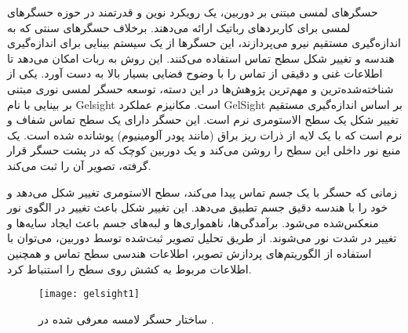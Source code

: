 حسگرهای لمسی مبتنی بر دوربین، یک رویکرد نوین و قدرتمند در حوزه حسگرهای لمسی برای کاربردهای رباتیک ارائه می‌دهند. برخلاف حسگرهای سنتی که به اندازه‌گیری مستقیم نیرو می‌پردازند، این حسگرها از یک سیستم بینایی برای اندازه‌گیری هندسه و تغییر شکل سطح تماس استفاده می‌کنند. این روش به ربات امکان می‌دهد تا اطلاعات غنی و دقیقی از تماس را با وضوح فضایی بسیار بالا به دست آورد.
یکی از شناخته‌شده‌ترین و مهم‌ترین پژوهش‌ها در این دسته، توسعه حسگر لمسی نوری مبتنی بر بینایی با نام Gelsight است. مکانیزم عملکرد GelSight بر اساس اندازه‌گیری مستقیم تغییر شکل یک سطح الاستومری نرم است. این حسگر دارای یک سطح تماس شفاف و نرم است که با یک لایه از ذرات ریز براق (مانند پودر آلومینیوم) پوشانده شده است. یک منبع نور داخلی این سطح را روشن می‌کند و یک دوربین کوچک که در پشت حسگر قرار گرفته، تصویر آن را ثبت می‌کند.


زمانی که حسگر با یک جسم تماس پیدا می‌کند، سطح الاستومری تغییر شکل می‌دهد و خود را با هندسه دقیق جسم تطبیق می‌دهد. این تغییر شکل باعث تغییر در الگوی نور منعکس‌شده می‌شود. برآمدگی‌ها، ناهمواری‌ها و لبه‌های جسم باعث ایجاد سایه‌ها و تغییر در شدت نور می‌شوند. از طریق تحلیل تصویر ثبت‌شده توسط دوربین، می‌توان با استفاده از الگوریتم‌های پردازش تصویر، اطلاعات هندسی سطح تماس و همچنین اطلاعات مربوط به کشش روی سطح را استنباط کرد.
\begin{figure}[t]
	\centering
	\texttt{[image: gelsight1]}
	\caption{ساختار حسگر لامسه 
		 معرفی شده در
		\cite{yuan2017gelsight}.}
	\label{fig:gelsight1}
\end{figure}

